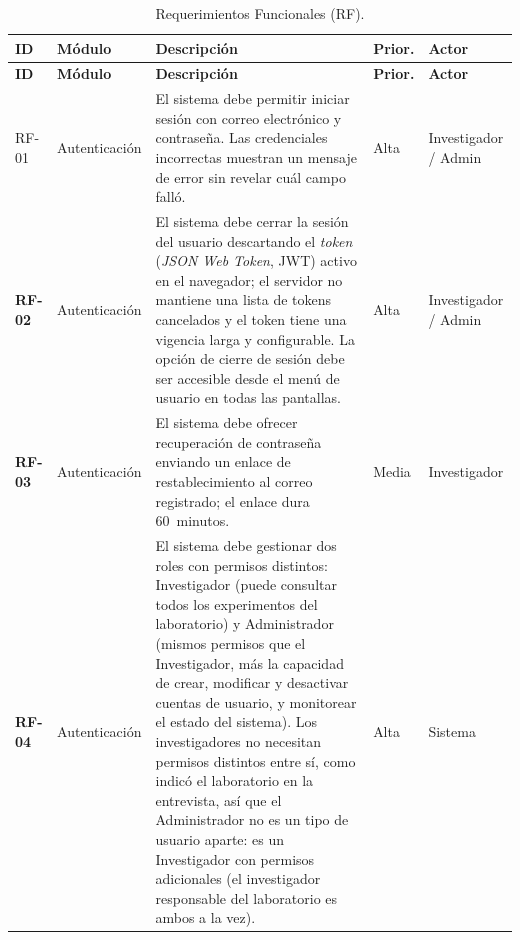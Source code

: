 \begin{longtable}{|>{\bfseries}p{1.1cm}|>{\raggedright}p{2.8cm}|>{\raggedright\arraybackslash}p{5.7cm}|p{1.3cm}|p{2.2cm}|}
\caption{Requerimientos Funcionales (RF).
\label{tab:rf}}\\
\hline
\textbf{ID} & \textbf{Módulo} & \textbf{Descripción} & \textbf{Prior.} & \textbf{Actor} \\
\hline
\endfirsthead
\hline
\textbf{ID} & \textbf{Módulo} & \textbf{Descripción} & \textbf{Prior.} & \textbf{Actor} \\
\hline
\endhead
\hline
\endfoot

RF-01 & Autenticación
      & El sistema debe permitir iniciar sesión con correo electrónico y
        contraseña. Las credenciales incorrectas muestran
        un mensaje de error sin revelar cuál campo falló.
      & Alta & Investigador / Admin \\
\hline
RF-02 & Autenticación
      & El sistema debe cerrar la sesión del usuario descartando el \textit{token} (\textit{JSON Web Token}, JWT) activo
        en el navegador; el servidor no mantiene una lista de tokens cancelados y el
        token tiene una vigencia larga y configurable. La opción de cierre de sesión
        debe ser accesible desde el menú de usuario en todas las pantallas.
      & Alta & Investigador / Admin \\
\hline
RF-03 & Autenticación
      & El sistema debe ofrecer recuperación de contraseña enviando un enlace de
        restablecimiento al correo registrado; el enlace dura 60~minutos.
      & Media & Investigador \\
\hline
RF-04 & Autenticación
      & El sistema debe gestionar dos roles con permisos distintos: Investigador
        (puede consultar todos los experimentos del laboratorio) y Administrador
        (mismos permisos que el Investigador, más la capacidad de crear, modificar
        y desactivar cuentas de usuario, y monitorear el estado del sistema). Los
        investigadores no necesitan permisos distintos entre sí, como indicó el
        laboratorio en la entrevista, así que el Administrador no es un tipo de
        usuario aparte: es un Investigador con permisos adicionales (el investigador
        responsable del laboratorio es ambos a la vez).
      & Alta & Sistema \\
\hline


\end{longtable}
